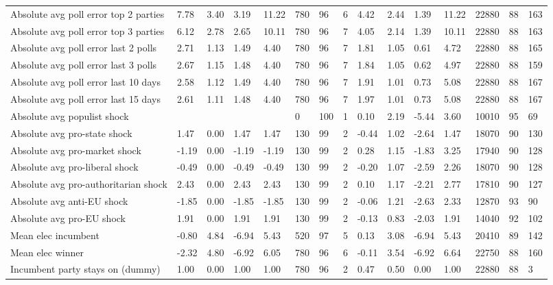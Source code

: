 \begin{longtable}{lllllllllllllll}
Absolute avg poll error top 2 parties & 7.78 & 3.40 & 3.19 & 11.22 & 780 & 96 & 6 & 4.42 & 2.44 & 1.39 & 11.22 & 22880 & 88 & 163\\
Absolute avg poll error top 3 parties & 6.12 & 2.78 & 2.65 & 10.11 & 780 & 96 & 7 & 4.05 & 2.14 & 1.39 & 10.11 & 22880 & 88 & 163\\
\addlinespace
Absolute avg poll error last 2 polls & 2.71 & 1.13 & 1.49 & 4.40 & 780 & 96 & 7 & 1.81 & 1.05 & 0.61 & 4.72 & 22880 & 88 & 165\\
Absolute avg poll error last 3 polls & 2.67 & 1.15 & 1.48 & 4.40 & 780 & 96 & 7 & 1.84 & 1.05 & 0.62 & 4.97 & 22880 & 88 & 159\\
Absolute avg poll error last 10 days & 2.58 & 1.12 & 1.49 & 4.40 & 780 & 96 & 7 & 1.91 & 1.01 & 0.73 & 5.08 & 22880 & 88 & 167\\
Absolute avg poll error last 15 days & 2.61 & 1.11 & 1.48 & 4.40 & 780 & 96 & 7 & 1.97 & 1.01 & 0.73 & 5.08 & 22880 & 88 & 167\\
Absolute avg populist shock &  &  &  &  & 0 & 100 & 1 & 0.10 & 2.19 & -5.44 & 3.60 & 10010 & 95 & 69\\
\addlinespace
Absolute avg pro-state shock & 1.47 & 0.00 & 1.47 & 1.47 & 130 & 99 & 2 & -0.44 & 1.02 & -2.64 & 1.47 & 18070 & 90 & 130\\
Absolute avg pro-market shock & -1.19 & 0.00 & -1.19 & -1.19 & 130 & 99 & 2 & 0.28 & 1.15 & -1.83 & 3.25 & 17940 & 90 & 128\\
Absolute avg pro-liberal shock & -0.49 & 0.00 & -0.49 & -0.49 & 130 & 99 & 2 & -0.20 & 1.07 & -2.59 & 2.26 & 18070 & 90 & 128\\
Absolute avg pro-authoritarian shock & 2.43 & 0.00 & 2.43 & 2.43 & 130 & 99 & 2 & 0.10 & 1.17 & -2.21 & 2.77 & 17810 & 90 & 127\\
Absolute avg anti-EU shock & -1.85 & 0.00 & -1.85 & -1.85 & 130 & 99 & 2 & -0.06 & 1.21 & -2.63 & 2.33 & 12870 & 93 & 90\\
\addlinespace
Absolute avg pro-EU shock & 1.91 & 0.00 & 1.91 & 1.91 & 130 & 99 & 2 & -0.13 & 0.83 & -2.03 & 1.91 & 14040 & 92 & 102\\
Mean elec incumbent & -0.80 & 4.84 & -6.94 & 5.43 & 520 & 97 & 5 & 0.13 & 3.08 & -6.94 & 5.43 & 20410 & 89 & 142\\
Mean elec winner & -2.32 & 4.80 & -6.92 & 6.05 & 780 & 96 & 6 & -0.11 & 3.54 & -6.92 & 6.64 & 22750 & 88 & 160\\
Incumbent party stays on (dummy) & 1.00 & 0.00 & 1.00 & 1.00 & 780 & 96 & 2 & 0.47 & 0.50 & 0.00 & 1.00 & 22880 & 88 & 3\\

\end{longtable}
